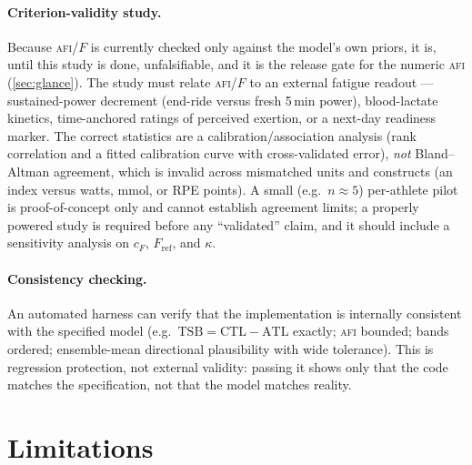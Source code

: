 \documentclass[11pt]{article}
\newcommand{\afi}{\textup{\textsc{afi}}}
\newcommand{\Fstate}{\ensuremath{F}}
\begin{document}
\paragraph{Criterion-validity study.} Because \afi{}/$\Fstate$ is currently checked only against the model's own priors, it is, until this study is done, unfalsifiable, and it is the release gate for the numeric \afi{} (\autoref{sec:glance}). The study must relate \afi{}/$\Fstate$ to an external fatigue readout --- sustained-power decrement (end-ride versus fresh 5\,min power), blood-lactate kinetics, time-anchored ratings of perceived exertion, or a next-day readiness marker. The correct statistics are a calibration/association analysis (rank correlation and a fitted calibration curve with cross-validated error), \emph{not} Bland--Altman agreement, which is invalid across mismatched units and constructs (an index versus watts, mmol, or RPE points). A small (e.g.\ $n\approx5$) per-athlete pilot is proof-of-concept only and cannot establish agreement limits; a properly powered study is required before any ``validated'' claim, and it should include a sensitivity analysis on $c_F$, $F_{\text{ref}}$, and $\kappa$.

\paragraph{Consistency checking.} An automated harness can verify that the implementation is internally consistent with the specified model (e.g.\ $\text{TSB}=\text{CTL}-\text{ATL}$ exactly; \afi{} bounded; bands ordered; ensemble-mean directional plausibility with wide tolerance). This is regression protection, not external validity: passing it shows only that the code matches the specification, not that the model matches reality.

\section{Limitations}\label{sec:limitations}
\end{document}
